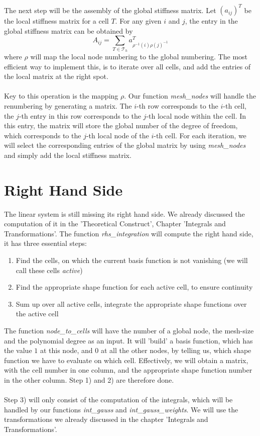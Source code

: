 \documentclass[a4paper,12pt]{article}
\begin{document}
\\
The next step will be the assembly of the global stiffness matrix.
Let $(a_{ij})^T$ be the local stiffness matrix for a cell $T$. For any given $i$ and $j$, the entry in the global stiffness matrix can be obtained by \[A_{ij}=\sum_{T \in \mathscr{T}_h}a_{\rho^{-1}(i)\rho(j)^{-1}}^T\] where $\rho$ will map the local node numbering to the global numbering. The most efficient way to implement this, is to iterate over all cells, and add the entries of the local matrix at the right spot.\\
\\
Key to this operation is the mapping $\rho$. Our function \textit{mesh\_nodes} will handle the renumbering by generating a matrix. The $i$-th row corresponds to the $i$-th cell, the $j$-th entry in this row corresponds to the $j$-th local node within the cell. In this entry, the matrix will store the global number of the degree of freedom, which corresponds to the $j$-th local node of the $i$-th cell. For each iteration, we will select the corresponding entries of the global matrix by using \textit{mesh\_nodes} and simply add the local stiffness matrix.

\section{Right Hand Side}
The linear system is still missing its right hand side. We already discussed the computation of it in the 'Theoretical Construct', Chapter 'Integrals and Transformations'. The function \textit{rhs\_integration} will compute the right hand side, it has three essential steps:
\begin{enumerate}
\item Find the cells, on which the current basis function is not vanishing (we will call these cells \textit{active})
\item Find the appropriate shape function for each active cell, to ensure continuity
\item Sum up over all active cells, integrate the appropriate shape functions over the active cell 
\end{enumerate}
The function \textit{node\_to\_cells} will have the number of a global node, the mesh-size and the polynomial degree as an input. It will 'build' a basis function, which has the value $1$ at this node, and $0$ at all the other nodes, by telling us, which shape function we have to evaluate on which cell. Effectively, we will obtain a matrix, with the cell number in one column, and the appropriate shape function number in the other column. Step 1) and 2) are therefore done.\\
\\
Step 3) will only consist of the computation of the integrals, which will be handled by our functions \textit{int\_gauss} and \textit{int\_gauss\_weights}. We will use the transformations we already discussed in the chapter 'Integrals and Transformations'.
\end{document}
